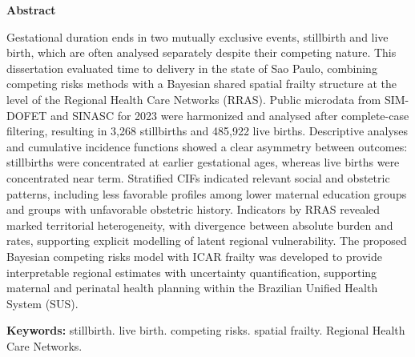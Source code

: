 %


{\centering
\large\bfseries Abstract\par}
\vspace{1.5cm}

\begin{singlespace}
Gestational duration ends in two mutually exclusive events, stillbirth and
live birth, which are often analysed separately despite their competing nature.
This dissertation evaluated time to delivery in the state of Sao Paulo,
combining competing risks methods with a Bayesian shared spatial frailty
structure at the level of the Regional Health Care Networks (RRAS). Public
microdata from SIM-DOFET and SINASC for 2023 were harmonized and analysed
after complete-case filtering, resulting in 3,268 stillbirths and 485,922 live
births. Descriptive analyses and cumulative incidence functions showed a clear
asymmetry between outcomes: stillbirths were concentrated at earlier
gestational ages, whereas live births were concentrated near term. Stratified
CIFs indicated relevant social and obstetric patterns, including less favorable
profiles among lower maternal education groups and groups with unfavorable
obstetric history. Indicators by RRAS revealed marked territorial heterogeneity,
with divergence between absolute burden and rates, supporting explicit
modelling of latent regional vulnerability. The proposed Bayesian competing
risks model with ICAR frailty was developed to provide interpretable regional
estimates with uncertainty quantification, supporting maternal and perinatal
health planning within the Brazilian Unified Health System (SUS).

\vspace{0.5cm}
\noindent\textbf{Keywords:} stillbirth. live birth. competing risks. spatial
frailty. Regional Health Care Networks.
\end{singlespace}


